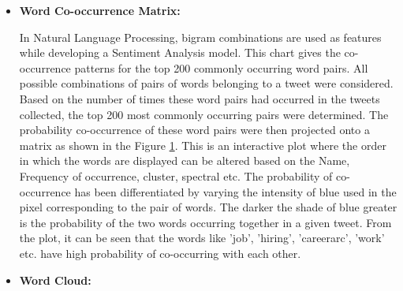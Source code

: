 \documentclass[9pt,twocolumn,twoside]{../../styles/osajnl}
\begin{document}
\begin{itemize}
    \item \textbf{Word Co-occurrence Matrix:}\\
    \begin{figure}[hbt]
    \centering
    \caption{}
    \label{fig:wordcooccur}
    \end{figure}
    In Natural Language Processing, bigram combinations are used as features while developing a Sentiment Analysis model. This chart gives the co-occurrence patterns for the top 200 commonly occurring word pairs. All possible combinations of pairs of words belonging to a tweet were considered. Based on the number of times these word pairs had occurred in the tweets collected, the top 200 most commonly occurring pairs were determined. The probability co-occurrence of these word pairs were then projected onto a matrix \cite{www-cooccur} as shown in the Figure \ref{fig:wordcooccur}. This is an interactive plot where the order in which the words are displayed can be altered based on the Name, Frequency of occurrence, cluster, spectral \cite{www-reorder} etc. The probability of co-occurrence has been differentiated by varying the intensity of blue used in the pixel corresponding to the pair of words. The darker the shade of blue greater is the probability of the two words occurring together in a given tweet. From the plot, it can be seen that the words like 'job', 'hiring', 'careerarc', 'work' etc. have high probability of co-occurring with each other. 
    \item \textbf{Word Cloud:}

\end{itemize}
\end{document}
